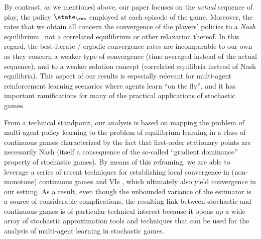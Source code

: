 By contrast, as we mentioned above, our paper focuses on the \emph{actual} sequence of play, \ie the policy $\curr$ employed at each episode of the game.
Moreover, the rates that we obtain all concern the convergence of the players' policies to a \emph{Nash} equilibrium \textendash\ not a correlated equilibrium or other relaxation thereof.
In this regard, the best-iterate / ergodic convergence rates are incomparable to our own as they concern a weaker type of convergence (time-averaged instead of the actual sequence), and to a weaker solution concept (correlated equilibria instead of Nash equilibria).
\endedit
This aspect of our results is especially relevant for multi-agent reinforcement learning scenarios where agents learn ``on the fly'', and it has important ramifications for many of the practical applications of stochastic games.

From a technical standpoint, our analysis is based on mapping the problem of multi-agent policy learning to the problem of equilibrium learning in a class of continuous games characterized by the fact that first-order stationary points are necessarily Nash (itself a consequence of the so-called ``gradient dominance'' property of stochastic games).
By means of this reframing, we are able to leverage a series of recent techniques for establishing local convergence in (non-monotone) continuous games and \aclp{VI} \citep{RBS16,CRMB20,MZ19,HIMM19,HIMM20,AIMM21}, which ultimately also yield convergence in our setting.
As a result, even though the unbounded variance of the \reinforce estimator is a source of considerable complications, the resulting link between stochastic and continuous games is of particular technical interest because it opens up a wide array of stochastic approximation tools and techniques that can be used for the analysis of multi-agent learning in stochastic games.